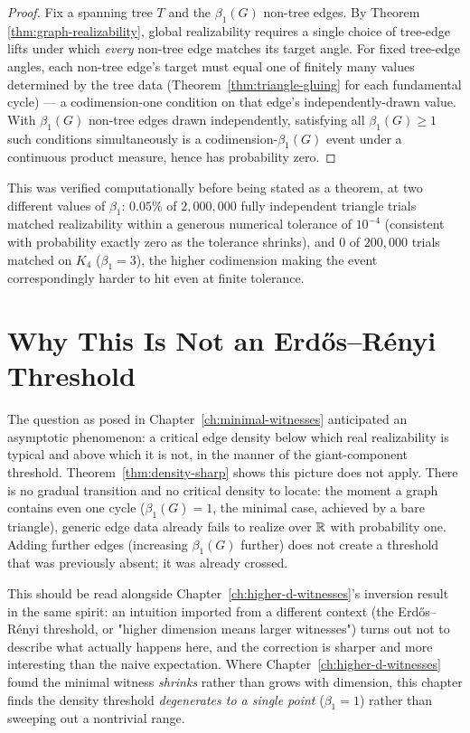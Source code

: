 \begin{proof}
Fix a spanning tree $T$ and the $\beta_1(G)$ non-tree edges. By Theorem
\ref{thm:graph-realizability}, global realizability requires a single
choice of tree-edge lifts under which \emph{every} non-tree edge matches
its target angle. For fixed tree-edge angles, each non-tree edge's target
must equal one of finitely many values determined by the tree data
(Theorem~\ref{thm:triangle-gluing} for each fundamental cycle) — a
codimension-one condition on that edge's independently-drawn value. With
$\beta_1(G)$ non-tree edges drawn independently, satisfying all
$\beta_1(G)\ge1$ such conditions simultaneously is a codimension-$\beta_1(G)$
event under a continuous product measure, hence has probability zero.
\end{proof}

This was verified computationally before being stated as a theorem, at
two different values of $\beta_1$: $0.05\%$ of $2{,}000{,}000$ fully
independent triangle trials matched realizability within a generous
numerical tolerance of $10^{-4}$ (consistent with probability exactly
zero as the tolerance shrinks), and $0$ of $200{,}000$ trials matched on
$K_4$ ($\beta_1=3$), the higher codimension making the event
correspondingly harder to hit even at finite tolerance.

\section{Why This Is Not an Erd\H{o}s--R\'enyi Threshold}

The question as posed in Chapter~\ref{ch:minimal-witnesses} anticipated an
asymptotic phenomenon: a critical edge density below which real
realizability is typical and above which it is not, in the manner of the
giant-component threshold. Theorem~\ref{thm:density-sharp} shows this
picture does not apply. There is no gradual transition and no critical
density to locate: the moment a graph contains even one cycle
($\beta_1(G)=1$, the minimal case, achieved by a bare triangle), generic
edge data already fails to realize over $\mathbb{R}$ with probability one. Adding
further edges (increasing $\beta_1(G)$ further) does not create a
threshold that was previously absent; it was already crossed.

\begin{remark}
This should be read alongside Chapter~\ref{ch:higher-d-witnesses}'s
inversion result in the same spirit: an intuition imported from a
different context (the Erd\H{o}s--R\'enyi threshold, or "higher
dimension means larger witnesses") turns out not to describe what
actually happens here, and the correction is sharper and more interesting
than the naive expectation. Where Chapter~\ref{ch:higher-d-witnesses}
found the minimal witness \emph{shrinks} rather than grows with dimension,
this chapter finds the density threshold \emph{degenerates to a single
point} ($\beta_1=1$) rather than sweeping out a nontrivial range.
\end{remark}

